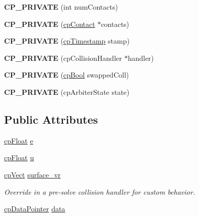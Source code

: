 \begin{DoxyCompactItemize}
\item 
\hypertarget{structcp_arbiter_a305708198dd7651c7df75c729b8d4e0f}{{\bfseries C\-P\-\_\-\-P\-R\-I\-V\-A\-T\-E} (int num\-Contacts)}\label{structcp_arbiter_a305708198dd7651c7df75c729b8d4e0f}

\item 
\hypertarget{structcp_arbiter_a3924875c18379c54eade2560e2c2aa26}{{\bfseries C\-P\-\_\-\-P\-R\-I\-V\-A\-T\-E} (\hyperlink{structcp_contact}{cp\-Contact} $\ast$contacts)}\label{structcp_arbiter_a3924875c18379c54eade2560e2c2aa26}

\item 
\hypertarget{structcp_arbiter_a4d2695363c4d9ca6eb35f33fa6a5d786}{{\bfseries C\-P\-\_\-\-P\-R\-I\-V\-A\-T\-E} (\hyperlink{group__basic_types_gaa24652c104082d0725066ea5ac7dc83f}{cp\-Timestamp} stamp)}\label{structcp_arbiter_a4d2695363c4d9ca6eb35f33fa6a5d786}

\item 
\hypertarget{structcp_arbiter_a13f09589bc4a16d4a055af1368664ca0}{{\bfseries C\-P\-\_\-\-P\-R\-I\-V\-A\-T\-E} (cp\-Collision\-Handler $\ast$handler)}\label{structcp_arbiter_a13f09589bc4a16d4a055af1368664ca0}

\item 
\hypertarget{structcp_arbiter_aa16a4d6a6e0307e41576a0044e72b2ba}{{\bfseries C\-P\-\_\-\-P\-R\-I\-V\-A\-T\-E} (\hyperlink{group__basic_types_gab6e5d8afee598a57cd323abae5310244}{cp\-Bool} swapped\-Coll)}\label{structcp_arbiter_aa16a4d6a6e0307e41576a0044e72b2ba}

\item 
\hypertarget{structcp_arbiter_a531c367a3c7b7ab3f0d8c29be4583435}{{\bfseries C\-P\-\_\-\-P\-R\-I\-V\-A\-T\-E} (cp\-Arbiter\-State state)}\label{structcp_arbiter_a531c367a3c7b7ab3f0d8c29be4583435}

\end{DoxyCompactItemize}
\subsection*{Public Attributes}
\begin{DoxyCompactItemize}
\item 
\hyperlink{group__basic_types_gac1ed65573e035bf892505768c852d8d3}{cp\-Float} \hyperlink{structcp_arbiter_ae28e688fb03eba42a1dd786ab914c9eb}{e}
\item 
\hyperlink{group__basic_types_gac1ed65573e035bf892505768c852d8d3}{cp\-Float} \hyperlink{structcp_arbiter_a1be4918be41986330005a6e745d013f3}{u}
\item 
\hyperlink{structcp_vect}{cp\-Vect} \hyperlink{structcp_arbiter_ad8724ab2c97ec732128fafc77668cc54}{surface\-\_\-vr}
\begin{DoxyCompactList}\small\item\em Override in a pre-\/solve collision handler for custom behavior. \end{DoxyCompactList}\item 
\hyperlink{group__basic_types_ga2ac2c3c31e21893941f9e4f8ee279447}{cp\-Data\-Pointer} \hyperlink{structcp_arbiter_afb41ae8c3e4df711f47ab7ac3ef7ed9a}{data}
\end{DoxyCompactItemize}


